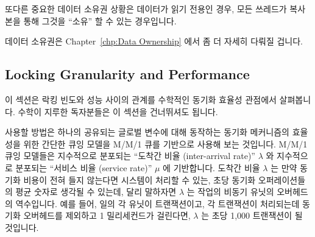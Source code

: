 또다른 중요한 데이터 소유권 상황은 데이터가 읽기 전용인 경우, 모든 쓰레드가
복사본을 통해 그것을 ``소유'' 할 수 있는 경우입니다.

데이터 소유권은 Chapter~\ref{chp:Data Ownership} 에서 좀 더 자세히 다뤄질
겁니다.

\subsection{Locking Granularity and Performance}
\label{sec:SMPdesign:Locking Granularity and Performance}

이 섹션은 락킹 빈도와 성능 사이의 관계를 수학적인 동기화 효율성 관점에서
살펴봅니다.
수학이 지루한 독자분들은 이 섹션을 건너뛰셔도 됩니다.

사용할 방법은 하나의 공유되는 글로벌 변수에 대해 동작하는 동기화 메커니즘의
효율성을 위한 간단한 큐잉 모델을 M/M/1 큐를 기반으로 사용해 보는 것입니다.
M/M/1 큐잉 모델들은 지수적으로 분포되는 ``도착간 비율 (inter-arrival rate)''
$\lambda$ 와 지수적으로 분포되는 ``서비스 비율 (service rate)'' $\mu$ 에
기반합니다.
도착간 비율 $\lambda$ 는 만약 동기화 비용이 전혀 들지 않는다면 시스템이 처리할
수 있는, 초당 동기화 오퍼레이션들의 평균 숫자로 생각될 수 있는데, 달리 말하자면
$\lambda$ 는 작업의 비동기 유닛의 오버헤드의 역수입니다.
예를 들어, 일의 각 유닛이 트랜잭션이고, 각 트랜잭션이 처리되는데 동기화
오버헤드를 제외하고 1 밀리세컨드가 걸린다면, $\lambda$ 는 초당 1,000 트랜잭션이
될 것입니다.

